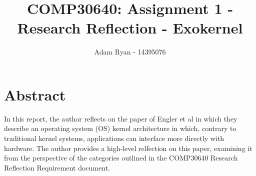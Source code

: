 \documentclass[11pt]{article}
\theoremstyle{plain}
\theoremstyle{definition}
\begin{document}
\title{COMP30640: Assignment 1 - Research Reflection - Exokernel}
\author{Adam Ryan - 14395076}
\maketitle

\section{Abstract}\label{section:Abstract}
In this report, the author reflects on the paper of Engler et al \cite{10.1145/224057.224076} in which they describe an operating system (OS) kernel architecture in which, contrary to traditional kernel systems, applications can interface more directly with hardware. The author provides a high-level relfection on this paper, examining it from the perspective of the categories outlined in the COMP30640 Research Reflection Requirement document.

\pagebreak
\tableofcontents
\pagebreak
\end{document}
